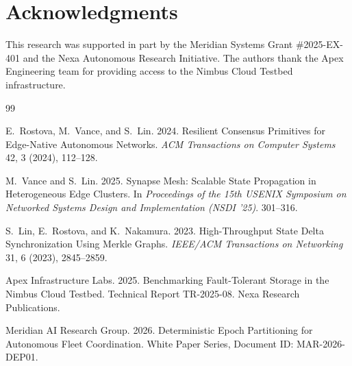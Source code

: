 \documentclass[10pt,a4paper]{article}
\begin{document}
\section*{Acknowledgments}
This research was supported in part by the Meridian Systems Grant \#2025-EX-401 and the Nexa Autonomous Research Initiative. The authors thank the Apex Engineering team for providing access to the Nimbus Cloud Testbed infrastructure.

\begin{thebibliography}{99}

E.~Rostova, M.~Vance, and S.~Lin. 2024.
\newblock Resilient Consensus Primitives for Edge-Native Autonomous Networks.
\newblock \emph{ACM Transactions on Computer Systems} 42, 3 (2024), 112--128.

M.~Vance and S.~Lin. 2025.
\newblock Synapse Mesh: Scalable State Propagation in Heterogeneous Edge Clusters.
\newblock In \emph{Proceedings of the 15th USENIX Symposium on Networked Systems Design and Implementation (NSDI '25)}. 301--316.

S.~Lin, E.~Rostova, and K.~Nakamura. 2023.
\newblock High-Throughput State Delta Synchronization Using Merkle Graphs.
\newblock \emph{IEEE/ACM Transactions on Networking} 31, 6 (2023), 2845--2859.

Apex Infrastructure Labs. 2025.
\newblock Benchmarking Fault-Tolerant Storage in the Nimbus Cloud Testbed.
\newblock Technical Report TR-2025-08. Nexa Research Publications.

Meridian AI Research Group. 2026.
\newblock Deterministic Epoch Partitioning for Autonomous Fleet Coordination.
\newblock White Paper Series, Document ID: MAR-2026-DEP01.

\end{thebibliography}
\end{document}
